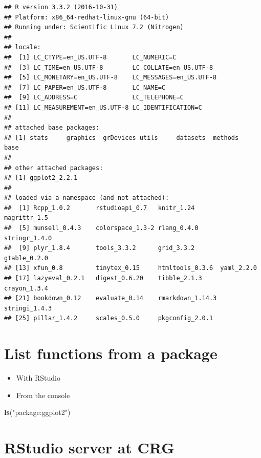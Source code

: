 \documentclass[]{book}
\newenvironment{Shaded}{\begin{snugshade}}{\end{snugshade}}
\newcommand{\KeywordTok}[1]{\textcolor[rgb]{0.13,0.29,0.53}{\textbf{#1}}}
\newcommand{\NormalTok}[1]{#1}
\newcommand{\StringTok}[1]{\textcolor[rgb]{0.31,0.60,0.02}{#1}}
\providecommand{\tightlist}{%
  \setlength{\itemsep}{0pt}\setlength{\parskip}{0pt}}
\begin{document}
\begin{verbatim}
## R version 3.3.2 (2016-10-31)
## Platform: x86_64-redhat-linux-gnu (64-bit)
## Running under: Scientific Linux 7.2 (Nitrogen)
## 
## locale:
##  [1] LC_CTYPE=en_US.UTF-8       LC_NUMERIC=C              
##  [3] LC_TIME=en_US.UTF-8        LC_COLLATE=en_US.UTF-8    
##  [5] LC_MONETARY=en_US.UTF-8    LC_MESSAGES=en_US.UTF-8   
##  [7] LC_PAPER=en_US.UTF-8       LC_NAME=C                 
##  [9] LC_ADDRESS=C               LC_TELEPHONE=C            
## [11] LC_MEASUREMENT=en_US.UTF-8 LC_IDENTIFICATION=C       
## 
## attached base packages:
## [1] stats     graphics  grDevices utils     datasets  methods   base     
## 
## other attached packages:
## [1] ggplot2_2.2.1
## 
## loaded via a namespace (and not attached):
##  [1] Rcpp_1.0.2       rstudioapi_0.7   knitr_1.24       magrittr_1.5    
##  [5] munsell_0.4.3    colorspace_1.3-2 rlang_0.4.0      stringr_1.4.0   
##  [9] plyr_1.8.4       tools_3.3.2      grid_3.3.2       gtable_0.2.0    
## [13] xfun_0.8         tinytex_0.15     htmltools_0.3.6  yaml_2.2.0      
## [17] lazyeval_0.2.1   digest_0.6.20    tibble_2.1.3     crayon_1.3.4    
## [21] bookdown_0.12    evaluate_0.14    rmarkdown_1.14.3 stringi_1.4.3   
## [25] pillar_1.4.2     scales_0.5.0     pkgconfig_2.0.1
\end{verbatim}

\hypertarget{list-functions-from-a-package}{%
\section{List functions from a package}\label{list-functions-from-a-package}}

\begin{itemize}
\tightlist
\item
  With RStudio 
\end{itemize}

\begin{itemize}
\tightlist
\item
  From the console
\end{itemize}

\begin{Shaded}
\begin{Highlighting}[]
\KeywordTok{ls}\NormalTok{(}\StringTok{"package:ggplot2"}\NormalTok{)}
\end{Highlighting}
\end{Shaded}

\hypertarget{rstudio-server-at-crg}{%
\section{RStudio server at CRG}\label{rstudio-server-at-crg}}
\end{document}

